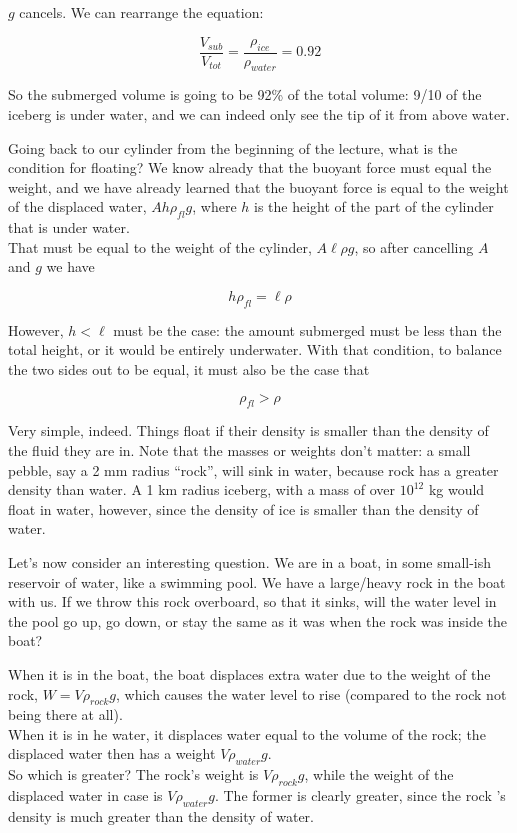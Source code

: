 $g$ cancels. We can rearrange the equation:

\begin{equation}
\frac{V_{sub}}{V_{tot}} = \frac{\rho_{ice}}{\rho_{water}} = 0.92
\end{equation}

So the submerged volume is going to be 92\% of the total volume: 9/10 of the iceberg is under water, and we can indeed only see the tip of it from above water.

Going back to our cylinder from the beginning of the lecture, what is the condition for floating? We know already that the buoyant force must equal the weight, and we have already learned that the buoyant force is equal to the weight of the displaced water, $A h \rho_{fl} g$, where $h$ is the height of the part of the cylinder that is under water.\\
That must be equal to the weight of the cylinder, $A \ell \rho g$, so after cancelling $A$ and $g$ we have

\begin{equation}
h \rho_{fl} = \ell \rho
\end{equation}

However, $h < \ell$ must be the case: the amount submerged must be less than the total height, or it would be entirely underwater. With that condition, to balance the two sides out to be equal, it must also be the case that

\begin{equation}
\rho_{fl} > \rho
\end{equation}

Very simple, indeed. Things float if their density is smaller than the density of the fluid they are in. Note that the masses or weights don't matter: a small pebble, say a 2 mm radius ``rock'', will sink in water, because rock has a greater density than water. A 1 km radius iceberg, with a mass of over $10^{12}$ kg would float in water, however, since the density of ice is smaller than the density of water.

Let's now consider an interesting question. We are in a boat, in some small-ish reservoir of water, like a swimming pool. We have a large/heavy rock in the boat with us. If we throw this rock overboard, so that it sinks, will the water level in the pool go up, go down, or stay the same as it was when the rock was inside the boat?

When it is in the boat, the boat displaces extra water due to the weight of the rock, $W = V \rho_{rock} g$, which causes the water level to rise (compared to the rock not being there at all).\\
When it is in he water, it displaces water equal to the volume of the rock; the displaced water then has a weight $V \rho_{water} g$.\\
So which is greater? The rock's weight is $V \rho_{rock} g$, while the weight of the displaced water in case is $V \rho_{water} g$. The former is clearly greater, since the rock 's density is much greater than the density of water.

